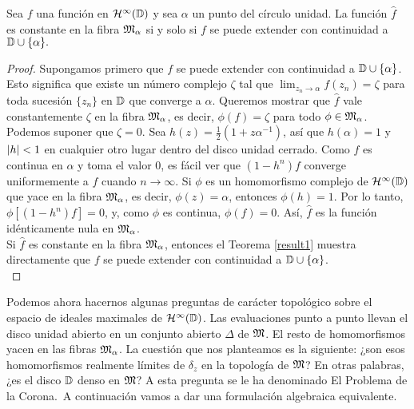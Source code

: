 \begin{theorem}
    Sea $f$ una función en $\mathcal{H}^{\infty}(\mathbb{D})$ y sea $\alpha$ un punto del círculo unidad. La función $\widehat f$ es constante en la fibra $\mathfrak{M}_\alpha$ si y solo si $f$ se puede extender con continuidad a $\mathbb{D} \cup \{\alpha\}.$
\end{theorem}

\begin{proof}
    Supongamos primero que $f$ se puede extender con continuidad a $\mathbb{D} \cup \{ \alpha\}$. Esto significa que existe un número complejo $\zeta$ tal que $\lim_{z_n \rightarrow \alpha} f(z_n) = \zeta$ para toda sucesión $\{z_n\}$ en $\mathbb{D}$ que converge a $\alpha$. Queremos mostrar que $\widehat f$ vale constantemente $\zeta$ en la fibra $\mathfrak{M}_\alpha$, es decir, $\phi(f) = \zeta$ para todo $\phi \in \mathfrak{M}_\alpha$. \\

    Podemos suponer que $\zeta = 0$. Sea $h(z) = \frac{1}{2} (1 + z \alpha^{-1})$, así que $h(\alpha) = 1$ y $\left\lvert h\right\rvert < 1$ en cualquier otro lugar dentro del disco unidad cerrado. Como $f$ es continua en $\alpha$ y toma el valor $0$, es fácil ver que $(1 - h^n) f$ converge uniformemente a $f$ cuando $n \rightarrow \infty$. Si $\phi$ es un homomorfismo complejo de $\mathcal{H}^{\infty}(\mathbb{D})$ que yace en la fibra $\mathfrak{M}_\alpha$, es decir, $\phi (z) = \alpha$, entonces $\phi (h) = 1$. Por lo tanto, $\phi [(1 - h^n)f] = 0$, y, como $\phi$ es continua, $\phi (f) = 0$. Así, $\widehat f$ es la función idénticamente nula en $\mathfrak{M}_\alpha$. \\


    Si $\widehat f$ es constante en la fibra $\mathfrak{M}_\alpha$, entonces el Teorema \ref{result1} muestra directamente que $f$ se puede extender con continuidad a $\mathbb{D} \cup \{ \alpha \}$. \\
\end{proof}


Podemos ahora hacernos algunas preguntas de carácter topológico sobre el espacio de ideales maximales de $\mathcal{H}^{\infty}(\mathbb{D})$. Las evaluaciones punto a punto llevan el disco unidad abierto en un conjunto abierto $\Delta$ de $\mathfrak{M}$. El resto de homomorfismos yacen en las fibras $\mathfrak{M}_\alpha$. La cuestión que nos planteamos es la siguiente: ¿son esos homomorfismos realmente límites de $\delta_z$ en la topología de $\mathfrak{M}$? En otras palabras, ¿es el disco $\mathbb{D}$ denso en $\mathfrak{M}$? A esta
pregunta se le ha denominado El Problema de la Corona. A continuación vamos a dar una formulación algebraica equivalente.\\

